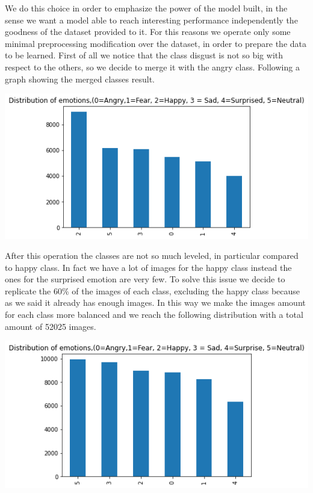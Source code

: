 \documentclass[10pt,twocolumn,letterpaper]{article}
\begin{document}
We do this choice in order to emphasize the power of the model built, in the sense we want a model able to reach interesting performance independently
the goodness of the dataset provided to it.
For this reasons we operate only some minimal preprocessing modification over the dataset, in order to prepare the data to be learned.
First of all we notice that the class disgust is not so big with respect to the others, so we decide to merge it with the angry class.
Following a graph showing the merged classes result.
\begin{center}
   \includegraphics[width=1\linewidth]{./immagini/6_classi.png}
\end{center}
After this operation the classes are not so much leveled, in particular compared to happy class.
In fact we have a lot of images for the happy class instead the ones for the surprised emotion are very few.
To solve this issue we decide to replicate the 60\% of the images of each class, excluding the happy class because as we said it already has enough images.
In this way we make the images amount for each class more balanced and we reach the following distribution with a total amount of 52025 images.
\begin{center}
   \includegraphics[width=1\linewidth]{./immagini/classi_bilanciate.png}
\end{center}
\end{document}
